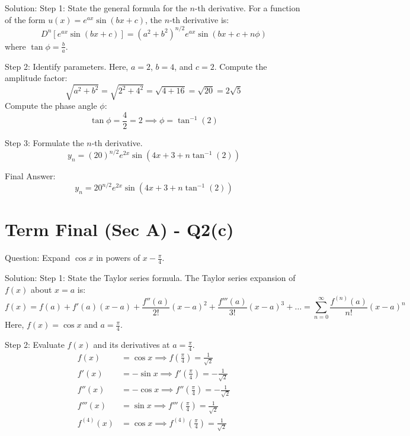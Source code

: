 \documentclass{article}
\begin{document}
Solution:
Step 1: State the general formula for the $n$-th derivative.
For a function of the form $u(x) = e^{ax} \sin(bx+c)$, the $n$-th derivative is:
\[
D^n [e^{ax} \sin(bx+c)] = (a^2+b^2)^{n/2} e^{ax} \sin\left( bx+c + n\phi \right)
\]
where $\tan\phi = \frac{b}{a}$.

Step 2: Identify parameters.
Here, $a = 2$, $b = 4$, and $c = 2$.
Compute the amplitude factor:
\[
\sqrt{a^2 + b^2} = \sqrt{2^2 + 4^2} = \sqrt{4 + 16} = \sqrt{20} = 2\sqrt{5}
\]
Compute the phase angle $\phi$:
\[
\tan\phi = \frac{4}{2} = 2 \implies \phi = \tan^{-1}(2)
\]

Step 3: Formulate the $n$-th derivative.
\[
y_n = (20)^{n/2} e^{2x} \sin\left( 4x+3 + n\tan^{-1}(2) \right)
\]

Final Answer:
\[
\boxed{y_n = 20^{n/2} e^{2x} \sin\left( 4x+3 + n\tan^{-1}(2) \right)}
\]

\section*{Term Final (Sec A) - Q2(c)}
Question:
Expand $\cos x$ in powers of $x - \frac{\pi}{4}$.

Solution:
Step 1: State the Taylor series formula.
The Taylor series expansion of $f(x)$ about $x = a$ is:
\[
f(x) = f(a) + f'(a)(x-a) + \frac{f''(a)}{2!}(x-a)^2 + \frac{f'''(a)}{3!}(x-a)^3 + \dots = \sum_{n=0}^\infty \frac{f^{(n)}(a)}{n!} (x-a)^n
\]
Here, $f(x) = \cos x$ and $a = \frac{\pi}{4}$.

Step 2: Evaluate $f(x)$ and its derivatives at $a = \frac{\pi}{4}$.
\begin{align*}
    f(x) &= \cos x \implies f\left(\frac{\pi}{4}\right) = \frac{1}{\sqrt{2}} \\
    f'(x) &= -\sin x \implies f'\left(\frac{\pi}{4}\right) = -\frac{1}{\sqrt{2}} \\
    f''(x) &= -\cos x \implies f''\left(\frac{\pi}{4}\right) = -\frac{1}{\sqrt{2}} \\
    f'''(x) &= \sin x \implies f'''\left(\frac{\pi}{4}\right) = \frac{1}{\sqrt{2}} \\
    f^{(4)}(x) &= \cos x \implies f^{(4)}\left(\frac{\pi}{4}\right) = \frac{1}{\sqrt{2}}
\end{align*}
\end{document}
